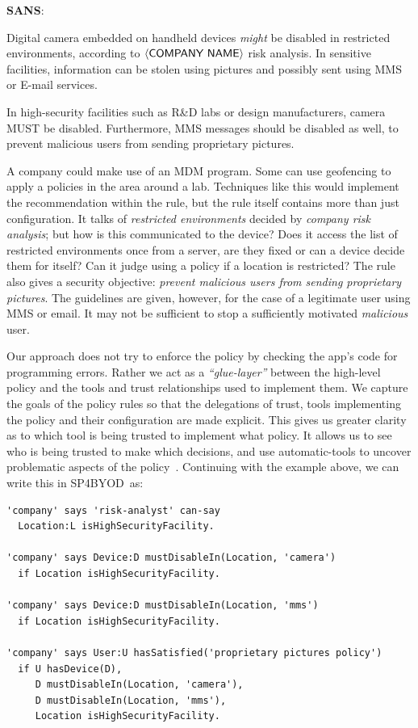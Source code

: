 \documentclass{llncs}
\newcommand{\AppPAL}[0]{SP4BYOD}
\newenvironment{policyrule}[1]{%
  \begin{mdframed}[]\footnotesize
      \noindent\textbf{\sffamily #1}:~\itshape%
}{%
  \end{mdframed}
}
\begin{document}
\newcommand{\textbra}[1]{\ensuremath{\left\langle \text{\sffamily #1} \right\rangle}}
\begin{policyrule}{SANS}
  Digital camera embedded on handheld devices \emph{might} be disabled in restricted environments, according to \textbra{COMPANY NAME} risk analysis.
  In sensitive facilities, information can be stolen using pictures and possibly sent using MMS or E-mail services.

  In high-security facilities such as R\&D labs or design manufacturers, camera MUST be disabled.
  Furthermore, MMS messages should be disabled as well, to prevent malicious users from sending proprietary pictures.
\end{policyrule}

A company could make use of an \ac{MDM} program.
Some can use geofencing to apply a policies in the area around a lab.
Techniques like this would implement the recommendation within the rule, but the rule itself contains more than just configuration.
It talks of \emph{restricted environments} decided by \emph{company risk analysis}; but how is this communicated to the device?
Does it access the list of restricted environments once from a server, are they fixed or can a device decide them for itself?
Can it judge using a policy if a location is restricted?
The rule also gives a security objective: \emph{prevent malicious users from sending proprietary pictures}.
The guidelines are given, however, for the case of a legitimate user using MMS or email.
It may not be sufficient to stop a sufficiently motivated \emph{malicious} user.

Our approach does not try to enforce the policy by checking the app's code for programming errors.
Rather we act as a \emph{``glue-layer''} between the high-level policy and the tools and trust relationships used to implement them.
We capture the goals of the policy rules so that the delegations of trust, tools implementing the policy and their configuration are made explicit.
This gives us greater clarity as to which tool is being trusted to implement what policy.
It allows us to see who is being trusted to make which decisions,
  and use automatic-tools to uncover problematic aspects of the policy~\cite{hallett_specifying_2016}.
Continuing with the example above, we can write this in \AppPAL~as:

\begin{lstlisting}
'company' says 'risk-analyst' can-say
  Location:L isHighSecurityFacility.

'company' says Device:D mustDisableIn(Location, 'camera')
  if Location isHighSecurityFacility.

'company' says Device:D mustDisableIn(Location, 'mms')
  if Location isHighSecurityFacility.

'company' says User:U hasSatisfied('proprietary pictures policy')
  if U hasDevice(D),
     D mustDisableIn(Location, 'camera'),
     D mustDisableIn(Location, 'mms'),
     Location isHighSecurityFacility.
\end{lstlisting}
\end{document}
